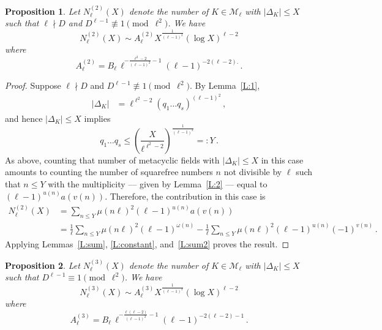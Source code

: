 \documentclass[12pt]{amsart}
\newtheorem{prop}{Proposition}
\begin{document}
\begin{prop}\label{P:2}
Let $N_\ell^{(2)}(X)$ denote the number of $K\in\mathcal{M}_\ell$ 
with $|\Delta_K|\leq X$ such that $\ell\nmid D$ and $D^{\ell-1}\not\equiv 1\pmod{\ell^2}$.
We have
$$N_\ell^{(2)}(X)\sim A_\ell^{(2)} X^{\frac{1}{(\ell-1)^2}}(\log X)^{\ell-2}$$
where
$$
  A_\ell^{(2)}=B_{\ell}\,\ell^{-\frac{\ell^2-2}{(\ell-1)^2}-1}(\ell-1)^{-2(\ell-2).}
  \,.
$$
\end{prop}


\begin{proof}
Suppose $\ell\nmid D$
and
$D^{\ell-1}\not\equiv 1\pmod{\ell^2}$.
By Lemma~\ref{L:1},
\begin{align*}
|\Delta_K| &= \ell^{\ell^2-2}(q_1 \dots q_s)^{(\ell-1)^2}
\,,
\end{align*}
and hence $|\Delta_K|\leq X$ implies
$$
  q_1\dots q_s\leq \left(\frac{X}{\ell^{\ell^2-2}}\right)^{\frac{1}{(\ell-1)^2}}=:Y
  \,.
$$
As above, counting that number of metacyclic fields with $|\Delta_K|\leq X$ in this case
amounts to counting the number of squarefree numbers $n$ not divisible by $\ell$
such that $n\leq Y$ with the multiplicity
--- given by Lemma~\ref{L:2} --- equal to $(\ell-1)^{u(n)}a(v(n))$. 
Therefore, the contribution in this case is
\begin{align*}
  N_\ell^{(2)}(X)&=\sum_{n\leq Y} \mu(n\ell)^2(\ell-1)^{u(n)}a(v(n))
\\
&=
\frac{1}{\ell}
\sum_{n\leq Y} \mu(n\ell)^2(\ell-1)^{\omega(n)}
-
\frac{1}{\ell}
\sum_{n\leq Y} \mu(n\ell)^2(\ell-1)^{u(n)}
(-1)^{v(n)}
\,.
\end{align*}
Applying Lemmas~\ref{L:sum}, \ref{L:constant}, and~\ref{L:sum2} proves the result.
\end{proof}



\begin{prop}\label{P:3}
Let $N_\ell^{(3)}(X)$ denote the number of $K\in\mathcal{M}_\ell$ 
with $|\Delta_K|\leq X$ such that $D^{\ell-1}\equiv 1\pmod{\ell^2}$.
We have
$$N_\ell^{(3)}(X)\sim A_\ell^{(3)} X^{\frac{1}{(\ell-1)^2}}(\log X)^{\ell-2}$$
where
$$
  A_\ell^{(3)}=B_{\ell}\,\ell^{-\frac{\ell(\ell-2)}{(\ell-1)^2}-1}(\ell-1)^{-2(\ell-2)-1}
  \,.
$$
\end{prop}
\end{document}
